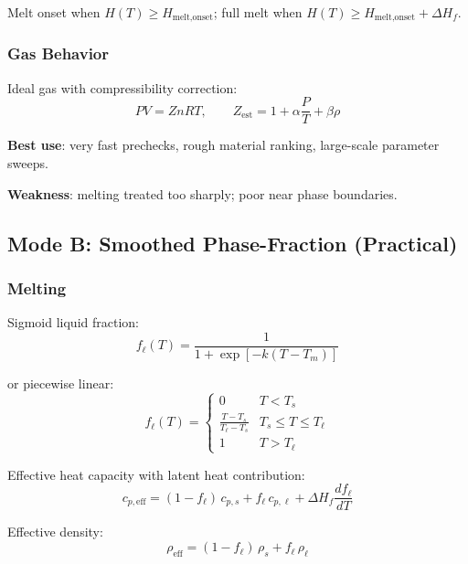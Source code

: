 \documentclass[11pt,a4paper]{article}
\begin{document}
Melt onset when $H(T) \geq H_{\text{melt,onset}}$; full melt when
$H(T) \geq H_{\text{melt,onset}} + \Delta H_f$.

\subsubsection{Gas Behavior}

Ideal gas with compressibility correction:
\begin{equation}
  PV = ZnRT, \qquad Z_{\text{est}} = 1 + \alpha\frac{P}{T} + \beta\rho
\end{equation}

\textbf{Best use}: very fast prechecks, rough material ranking,
large-scale parameter sweeps.

\textbf{Weakness}: melting treated too sharply; poor near phase boundaries.

\subsection{Mode B: Smoothed Phase-Fraction (Practical)}

\subsubsection{Melting}

Sigmoid liquid fraction:
\begin{equation}
  f_\ell(T) = \frac{1}{1 + \exp[-k(T - T_m)]}
\end{equation}

or piecewise linear:
\begin{equation}
  f_\ell(T) = \begin{cases}
    0 & T < T_s \\
    \frac{T - T_s}{T_\ell - T_s} & T_s \leq T \leq T_\ell \\
    1 & T > T_\ell
  \end{cases}
\end{equation}

Effective heat capacity with latent heat contribution:
\begin{equation}
  c_{p,\text{eff}} = (1 - f_\ell)\,c_{p,s} + f_\ell\,c_{p,\ell}
                    + \Delta H_f \frac{df_\ell}{dT}
\end{equation}

Effective density:
\begin{equation}
  \rho_{\text{eff}} = (1 - f_\ell)\,\rho_s + f_\ell\,\rho_\ell
\end{equation}
\end{document}
